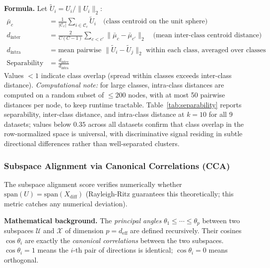 \documentclass[11pt]{article}
\begin{document}
\textbf{Formula.}  Let $\tilde{U}_i = U_i / \|U_i\|_2$:
\begin{align}
  \bar{\mu}_c &= \frac{1}{|\mathcal{C}_c|}\sum_{i \in \mathcal{C}_c}\tilde{U}_i
  \quad \text{(class centroid on the unit sphere)} \\
  d_{\mathrm{inter}} &= \frac{2}{C(C-1)}\sum_{c < c'} \|\bar{\mu}_c - \bar{\mu}_{c'}\|_2
  \quad \text{(mean inter-class centroid distance)} \\
  d_{\mathrm{intra}} &= \text{mean pairwise } \|\tilde{U}_i - \tilde{U}_j\|_2
    \text{ within each class, averaged over classes} \\
  \mathrm{Separability} &= \frac{d_{\mathrm{inter}}}{d_{\mathrm{intra}}}
  \label{eq:separability}
\end{align}
Values $<1$ indicate class overlap (spread within classes exceeds inter-class distance).
\emph{Computational note:} for large classes, intra-class distances are computed on a
random subset of $\leq 200$ nodes, with at most 50 pairwise distances per node, to
keep runtime tractable.
Table~\ref{tab:separability} reports separability, inter-class distance, and
intra-class distance at $k{=}10$ for all 9 datasets; values below $0.35$ across
all datasets confirm that class overlap in the row-normalized space is universal,
with discriminative signal residing in subtle directional differences rather than
well-separated clusters.

\subsubsection*{Subspace Alignment via Canonical Correlations (CCA)}

The subspace alignment score verifies numerically whether $\mathrm{span}(U) =
\mathrm{span}(X_{\mathrm{diff}})$ (Rayleigh-Ritz guarantees this theoretically;
this metric catches any numerical deviation).

\textbf{Mathematical background.}
The \emph{principal angles} $\theta_1 \leq \cdots \leq \theta_p$
between two subspaces $\mathcal{U}$ and $\mathcal{X}$ of dimension $p = d_{\mathrm{eff}}$
are defined recursively.  Their cosines $\cos\theta_i$ are exactly the
\emph{canonical correlations} between the two subspaces.
$\cos\theta_i = 1$ means the $i$-th pair of directions is identical;
$\cos\theta_i = 0$ means orthogonal.
\end{document}
